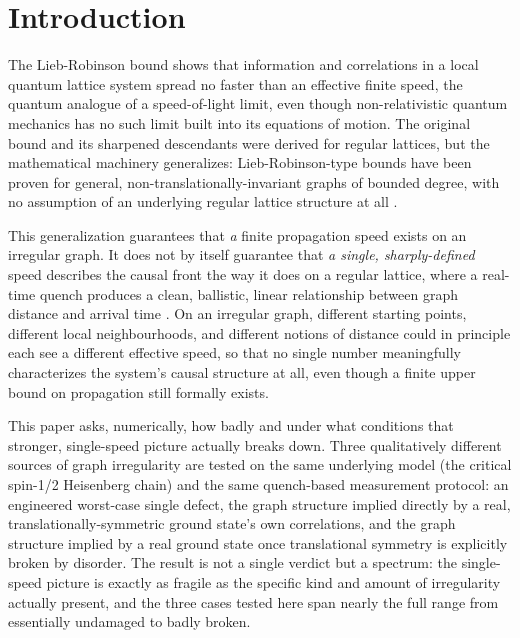 \documentclass[11pt]{article}
\begin{document}
\section{Introduction}
\label{sec:intro}

The Lieb-Robinson bound \cite{LiebRobinson1972} shows that information and correlations in a local quantum lattice system spread no faster than an effective finite speed, the quantum analogue of a speed-of-light limit, even though non-relativistic quantum mechanics has no such limit built into its equations of motion. The original bound and its sharpened descendants \cite{NOS2006,NachtergaeleSims2006} were derived for regular lattices, but the mathematical machinery generalizes: Lieb-Robinson-type bounds have been proven for general, non-translationally-invariant graphs of bounded degree, with no assumption of an underlying regular lattice structure at all \cite{NachtergaeleSims2007}.

This generalization guarantees that \emph{a} finite propagation speed exists on an irregular graph. It does not by itself guarantee that \emph{a single, sharply-defined} speed describes the causal front the way it does on a regular lattice, where a real-time quench produces a clean, ballistic, linear relationship between graph distance and arrival time \cite{Cheneau2012}. On an irregular graph, different starting points, different local neighbourhoods, and different notions of distance could in principle each see a different effective speed, so that no single number meaningfully characterizes the system's causal structure at all, even though a finite upper bound on propagation still formally exists.

This paper asks, numerically, how badly and under what conditions that stronger, single-speed picture actually breaks down. Three qualitatively different sources of graph irregularity are tested on the same underlying model (the critical spin-1/2 Heisenberg chain) and the same quench-based measurement protocol: an engineered worst-case single defect, the graph structure implied directly by a real, translationally-symmetric ground state's own correlations, and the graph structure implied by a real ground state once translational symmetry is explicitly broken by disorder. The result is not a single verdict but a spectrum: the single-speed picture is exactly as fragile as the specific kind and amount of irregularity actually present, and the three cases tested here span nearly the full range from essentially undamaged to badly broken.
\end{document}
